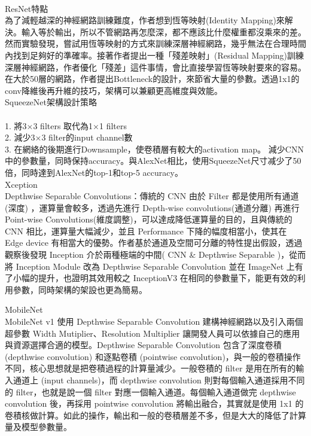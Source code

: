\begin{flushleft}
  \\ResNet特點 \cite{ResNet}
  \\\hspace{2em}
  為了減輕越深的神經網路訓練難度，作者想到恆等映射(Identity Mapping)來解決。輸入等於輸出，所以不管網路再怎麼深，都不應該比什麼權重都沒乘來的差。然而實驗發現，嘗試用恆等映射的方式來訓練深層神經網路，幾乎無法在合理時間內找到足夠好的準確率。接著作者提出一種「殘差映射」(Residual Mapping)訓練深層神經網路，作者優化「殘差」這件事情，會比直接學習恆等映射要來的容易。在大於50層的網路，作者提出Bottleneck的設計，來節省大量的參數。透過1x1的conv降維後再升維的技巧，架構可以兼顧更高維度與效能。
  \\SqueezeNet架構設計策略\cite{SqueezeNet}
  \\\hspace{2em}
  \\1.	將3×3 filters 取代為1×1 filters
  \\2.	減少3×3 filter的input channel數
  \\3.	在網絡的後期進行Downsample，使卷積層有較大的activation map。
  減少CNN中的參數量，同時保持accuracy。與AlexNet相比，使用SqueezeNet尺寸减少了50倍，同時達到AlexNet的top-1和top-5 accuracy。
  \\Xception \cite{Xception}
  \\\hspace{2em}
  Depthwise Separable Convolutions：傳統的 CNN 由於 Filter 都是使用所有通道(深度) ，運算量會較多，透過先進行 Depth-wise convolutions(通道分離) 再進行 Point-wise Convolutions(維度調整)，可以達成降低運算量的目的，且與傳統的 CNN 相比，運算量大幅減少，並且 Performance 下降的幅度相當小，使其在 Edge device 有相當大的優勢。作者基於通道及空間可分離的特性提出假設，透過觀察後發現 Inception 介於兩種極端的中間( CNN \& Depthwise Separable )，從而將 Inception Module 改為 Depthwise Separable Convolution 並在 ImageNet 上有了小幅的提升，也證明其效用較之 InceptionV3 在相同的參數量下，能更有效的利用參數，同時架構的架設也更為簡易。

  MobileNet \cite{MobileNet}
  \\\hspace{2em}
  MobileNet v1 使用 Depthwise Separable Convolution 建構神經網路以及引入兩個超參數 Width Mutiplier、Resolution Multiplier 讓開發人員可以依據自己的應用與資源選擇合適的模型。Depthwise Separable Convolution 包含了深度卷積 (depthwise convolution) 和逐點卷積 (pointwise convolution)，與一般的卷積操作不同，核心思想就是把卷積過程的計算量減少。一般卷積的 filter 是用在所有的輸入通道上 (input channels)，而 depthwise convolution 則對每個輸入通道採用不同的 filter，也就是說一個 filter 對應一個輸入通道。每個輸入通道做完 depthwise convolution 後，再採用 pointwise convolution 將輸出融合，其實就是使用 1x1 的卷積核做計算。如此的操作，輸出和一般的卷積層差不多，但是大大的降低了計算量及模型參數量。


\end{flushleft}
